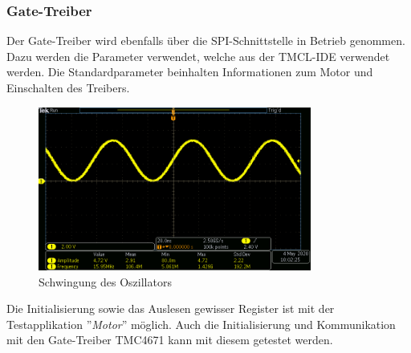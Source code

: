 \subsubsection{Gate-Treiber}
\label{subsubsec:Inbetriebnahme_Gate_Treiber}

Der Gate-Treiber wird ebenfalls über die SPI-Schnittstelle in Betrieb genommen. Dazu werden die Parameter verwendet, welche aus der TMCL-IDE verwendet werden. Die Standardparameter beinhalten Informationen zum Motor  und Einschalten des Treibers.

\begin{figure}[h!]
\center
\includegraphics[width = 0.8\textwidth]{graphics/Crystal_Swing}
\caption{Schwingung des Oszillators}
\label{fig:Crystal_Swing}
\end{figure}

Die Initialisierung sowie das Auslesen gewisser Register ist mit der Testapplikation ''\textit{Motor}'' möglich. Auch die Initialisierung und Kommunikation mit den Gate-Treiber TMC4671 kann mit diesem getestet werden.

